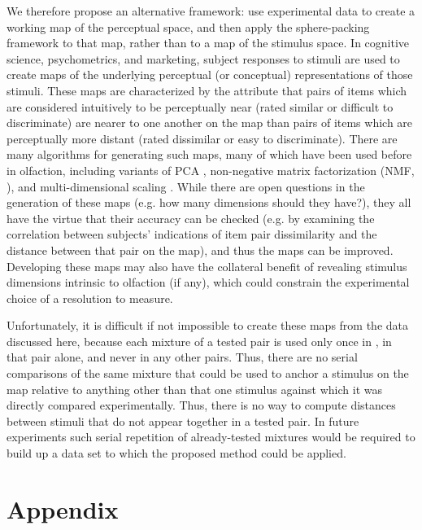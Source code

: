 \documentclass[letterpaper,twocolumn,10pt]{article}
\begin{document}
We therefore propose an alternative framework: 
use experimental data to create a working map of the perceptual space, 
and then apply the sphere-packing framework to that map, 
rather than to a map of the stimulus space.  
In cognitive science, psychometrics, and marketing, subject responses to stimuli are used 
to create maps of the underlying perceptual (or conceptual) representations of those stimuli.  
These maps are characterized by the attribute that pairs of items which are considered intuitively to be perceptually near 
(rated similar or difficult to discriminate) are nearer to one another on the map than pairs of items 
which are perceptually more distant (rated dissimilar or easy to discriminate).  
There are many algorithms for generating such maps, 
many of which have been used before in olfaction, 
including variants of PCA \cite{khan_predicting_2007,koulakov_in_search_2011,zarzo_identification_2006}, 
non-negative matrix factorization (NMF, \cite{castro_categorical_2013}), 
and multi-dimensional scaling \cite{mamlouk_quantifying_2003}.  
While there are open questions in the generation of these maps 
(e.g. how many dimensions should they have?), 
they all have the virtue that their accuracy can be checked 
(e.g. by examining the correlation between subjects' indications of item pair dissimilarity and the distance between that pair on the map), 
and thus the maps can be improved. 
Developing these maps may also have the collateral benefit of revealing stimulus dimensions intrinsic to olfaction (if any), 
which could constrain the experimental choice of a resolution to measure.

Unfortunately, it is difficult if not impossible to create these maps from the data discussed here, 
because each mixture of a tested pair is used only once in \cite{bushdid_humans_2014}, 
in that pair alone, and never in any other pairs.  
Thus, there are no serial comparisons of the same mixture that could be used to anchor a stimulus on the map 
relative to anything other than that one stimulus against which it was directly compared experimentally.  
Thus, there is no way to compute distances between stimuli that do not appear together in a tested pair.  
In future experiments such serial repetition of already-tested mixtures would be required 
to build up a data set to which the proposed method could be applied.  
\section{Appendix} 
\end{document}
